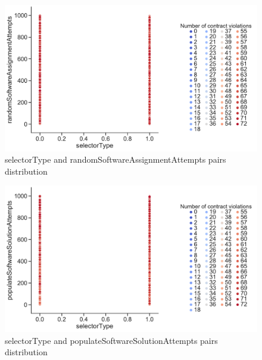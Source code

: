 \begin{figure}
	\centering
	\includegraphics[width=\textwidth]{images/PairsDistr/selectorType_randomSoftwareAssignmentAttempts.pdf}
	\caption[selectorType and randomSoftwareAssignmentAttempts pairs distribution]{selectorType and randomSoftwareAssignmentAttempts pairs distribution}
	\label{fig:selectorType_randomSoftwareAssignmentAttempts_pair}
\end{figure}
\begin{figure}
	\centering
	\includegraphics[width=\textwidth]{images/PairsDistr/selectorType_populateSoftwareSolutionAttempts.pdf}
	\caption[selectorType and populateSoftwareSolutionAttempts pairs distribution]{selectorType and populateSoftwareSolutionAttempts pairs distribution}
	\label{fig:selectorType_populateSoftwareSolutionAttempts_pair}
\end{figure}
